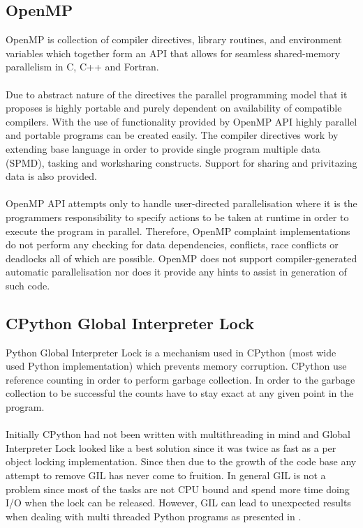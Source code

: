 \documentclass[12pt, a4paper]{report}
\begin{document}
\subsection{OpenMP}\label{subsec:openmp}
OpenMP\cite{OpenMP3.1} is collection of compiler directives, library routines, and environment variables
which together form an API that allows for seamless shared-memory parallelism
in C, C++ and Fortran.
\\\\
Due to abstract nature of the directives the parallel programming model that it proposes
is highly portable and purely dependent on availability of compatible compilers.
With the use of functionality provided by OpenMP API highly parallel and portable programs
can be created easily. The compiler directives work by extending base language in
order to provide single program multiple data (SPMD), tasking and worksharing constructs.
Support for sharing and privitazing data is also provided.
\\\\
OpenMP API attempts only to handle user-directed parallelisation where it is the programmers
responsibility to specify actions to be taken at runtime in order to execute the program
in parallel. Therefore, OpenMP complaint implementations do not perform any checking for
data dependencies, conflicts, race conflicts or deadlocks all of which are possible.
OpenMP does not support compiler-generated automatic parallelisation nor does it provide
any hints to assist in generation of such code.

\subsection{CPython Global Interpreter Lock}\label{subsec:gil}
Python Global Interpreter Lock is a mechanism used in CPython (most wide used Python implementation)
which prevents memory corruption. CPython use reference counting in order to perform garbage collection.
In order to the garbage collection to be successful the counts have to stay exact at any given point
in the program.
\\\\
Initially CPython had not been written with multithreading in mind and Global Interpreter Lock
looked like a best solution since it was twice as fast as a per object locking implementation.
Since then due to the growth of the code base any attempt to remove GIL has never come to fruition.
In general GIL is not a problem since most of the tasks are not CPU bound and spend more time doing
I/O when the lock can be released. However, GIL can lead to unexpected results when dealing with
multi threaded Python programs as presented in \cite{UnderstandingGIL}.
\end{document}
